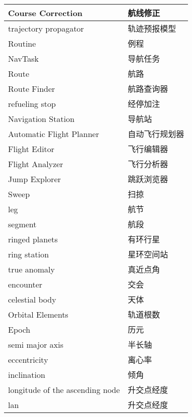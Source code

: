 \documentclass[a4paper]{article}
\theoremstyle{definition}
\begin{document}
{{\begin{longtable}{|p{4.5cm}|p{10cm}|}
	Course Correction               & 航线修正    \\ \hline
	trajectory propagator           & 轨迹预报模型  \\ \hline
	Routine                         & 例程      \\ \hline
	NavTask                         & 导航任务    \\ \hline
	Route                           & 航路      \\ \hline
	Route Finder                    & 航路查询器   \\ \hline
	refueling stop                  & 经停加注    \\ \hline
	Navigation Station              & 导航站     \\ \hline
	Automatic Flight Planner        & 自动飞行规划器 \\ \hline
	Flight Editor                   & 飞行编辑器   \\ \hline
	Flight Analyzer                 & 飞行分析器   \\ \hline
	Jump Explorer                   & 跳跃浏览器   \\ \hline
	Sweep                           & 扫掠      \\ \hline
	leg                             & 航节      \\ \hline
	segment                         & 航段      \\ \hline
	ringed planets                  & 有环行星    \\ \hline
	ring station                    & 星环空间站   \\ \hline
	true anomaly                    & 真近点角    \\ \hline
	encounter                       & 交会      \\ \hline
	celestial body                  & 天体      \\ \hline
	Orbital Elements                & 轨道根数    \\ \hline
	Epoch                           & 历元      \\ \hline
	semi major axis                 & 半长轴     \\ \hline
	eccentricity                    & 离心率     \\ \hline
	inclination                     & 倾角      \\ \hline
	longitude of the ascending node & 升交点经度   \\ \hline
	lan                             & 升交点经度   \\ \hline

\end{longtable}}}
\end{document}
